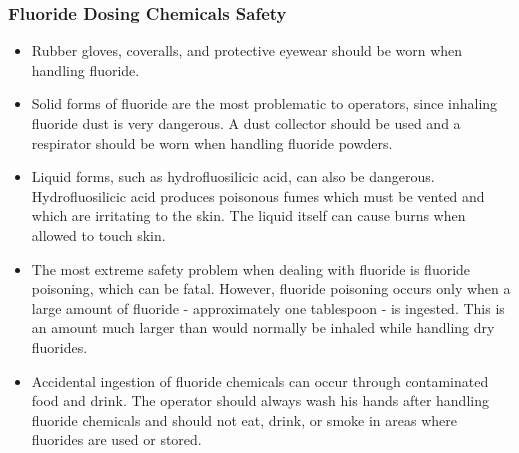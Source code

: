 \subsubsection{Fluoride Dosing Chemicals Safety}
\begin{itemize}
\item Rubber gloves, coveralls, and protective eyewear should be worn when handling fluoride. 
\item Solid forms of fluoride are the most problematic to operators, since inhaling fluoride dust is very dangerous.  A dust collector should be used and a respirator should be worn when handling fluoride powders. 
\item Liquid forms, such as hydrofluosilicic acid, can also be dangerous.  Hydrofluosilicic acid produces poisonous fumes which must be vented and which are irritating to the skin.  The liquid itself can cause burns when allowed to touch skin.
\item The most extreme safety problem when dealing with fluoride is fluoride poisoning, which can be fatal.  However, fluoride poisoning occurs only when a large amount of fluoride - approximately one tablespoon - is ingested.  This is an amount much larger than would normally be inhaled while handling dry fluorides.  \item Accidental ingestion of fluoride chemicals can occur through contaminated food and drink.  The operator should always wash his hands after handling fluoride chemicals and should not eat, drink, or smoke in areas where fluorides are used or stored.\\
\end{itemize}

